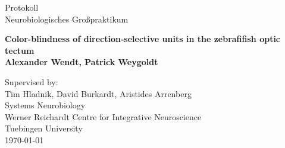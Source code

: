 \begin{titlepage}
\begin{center}

\vspace*{0.5cm}
\Large
Protokoll\\
Neurobiologisches Großpraktikum\\
\vspace{1cm}

\Huge
\textbf{Color-blindness of direction-selective units in the zebrafifish optic tectum}\\
\Large
\vspace{1cm}
\textbf{Alexander Wendt, Patrick Weygoldt}
\vspace{1cm}

\vfill

\large
\vspace{0.5cm}
Supervised by:\\
\vspace{0.5cm}
Tim Hladnik, David Burkardt, Aristides Arrenberg\\
Systems Neurobiology\\
Werner Reichardt Centre for
Integrative Neuroscience \\
Tuebingen University\\
\vspace{1cm}
\today \\
\vspace{0.5cm}

        
\end{center}
\end{titlepage}
